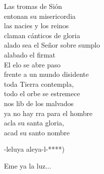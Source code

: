 \begin{cancion}
	\jump
	Las tromas de Sión \\
	\jump
entonan su misericordia\\
	las nacies y los reinos \\
	\jump
claman cánticos de gloria\\
	alado sea el Señor sobre sumplo\\
	alabado el firmat\\
	\jump
	El elo se abre paso \\
	\jump
frente a un mundo disidente\\
	toda  Tierra contempla, \\
	\jump
todo el orbe se estremece\\
	nos lib de los malvados  \\
	ya no hay rra para el hombre\\
	acla su santa gloria,\\
	 acad su santo nombre\jump\\
	\begin{chorus}%
		-leluya aleya-l-****)\jump\\
	\end{chorus}%
	\jump
	Eme ya la luz...\\
	\jump
\end{cancion}%
